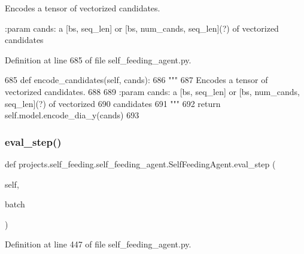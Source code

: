 \begin{DoxyVerb}Encodes a tensor of vectorized candidates.

:param cands: a [bs, seq_len] or [bs, num_cands, seq_len](?) of vectorized
    candidates
\end{DoxyVerb}
 

Definition at line 685 of file self\+\_\+feeding\+\_\+agent.\+py.


\begin{DoxyCode}
685     \textcolor{keyword}{def }encode\_candidates(self, cands):
686         \textcolor{stringliteral}{"""}
687 \textcolor{stringliteral}{        Encodes a tensor of vectorized candidates.}
688 \textcolor{stringliteral}{}
689 \textcolor{stringliteral}{        :param cands: a [bs, seq\_len] or [bs, num\_cands, seq\_len](?) of vectorized}
690 \textcolor{stringliteral}{            candidates}
691 \textcolor{stringliteral}{        """}
692         \textcolor{keywordflow}{return} self.model.encode\_dia\_y(cands)
693 
\end{DoxyCode}
\mbox{\label{classprojects_1_1self__feeding_1_1self__feeding__agent_1_1SelfFeedingAgent_af50200b087a797a01b5e5ccdd1be63ba}} 
\subsubsection{\texorpdfstring{eval\+\_\+step()}{eval\_step()}}
{\footnotesize\ttfamily def projects.\+self\+\_\+feeding.\+self\+\_\+feeding\+\_\+agent.\+Self\+Feeding\+Agent.\+eval\+\_\+step (\begin{DoxyParamCaption}\item[{}]{self,  }\item[{}]{batch }\end{DoxyParamCaption})}



Definition at line 447 of file self\+\_\+feeding\+\_\+agent.\+py.


